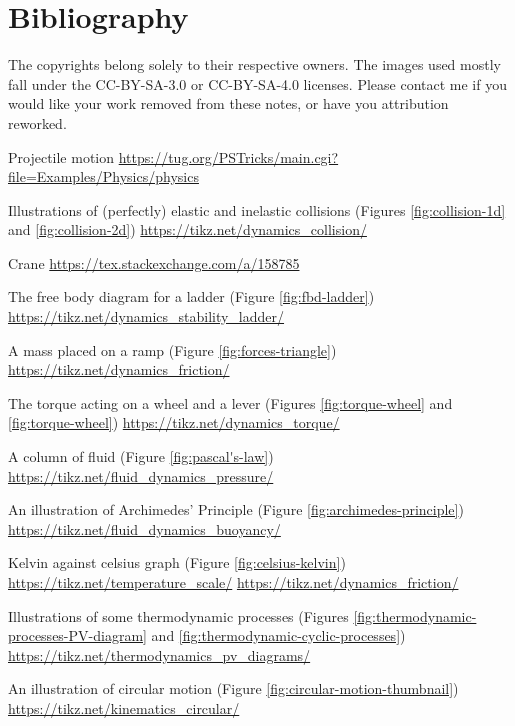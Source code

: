 \documentclass[oneside]{book}
\begin{document}
\chapter{Bibliography}
The copyrights belong solely to their respective owners. The images used mostly fall under the CC-BY-SA-3.0 or CC-BY-SA-4.0 licenses. Please contact me if you would like your work removed from these notes, or have you attribution reworked. 
\begin{enumerate}[label={[\arabic*]}]
    \item\label{Projectile motion} Projectile motion \url{https://tug.org/PSTricks/main.cgi?file=Examples/Physics/physics}
    \item\label{source:collision} Illustrations of (perfectly) elastic and inelastic collisions (Figures \ref{fig:collision-1d} and \ref{fig:collision-2d}) \url{https://tikz.net/dynamics_collision/}
    \item\label{Crane} Crane \url{https://tex.stackexchange.com/a/158785}
    \item\label{source:fbd-ladder} The free body diagram for a ladder (Figure \ref{fig:fbd-ladder}) \url{https://tikz.net/dynamics_stability_ladder/} 
    \item\label{source:forces-triangle} A mass placed on a ramp (Figure \ref{fig:forces-triangle}) \url{https://tikz.net/dynamics_friction/}
    \item\label{source:torque} The torque acting on a wheel and a lever (Figures \ref{fig:torque-wheel} and \ref{fig:torque-wheel}) \url{https://tikz.net/dynamics_torque/}
    \item\label{source:pascal's-law} A column of fluid (Figure \ref{fig:pascal's-law}) \url{https://tikz.net/fluid_dynamics_pressure/}
    \item\label{source:archimedes-principle} An illustration of Archimedes' Principle (Figure \ref{fig:archimedes-principle}) \url{https://tikz.net/fluid_dynamics_buoyancy/}
    \item\label{source:celsius-kelvin} Kelvin against celsius graph (Figure \ref{fig:celsius-kelvin}) \url{https://tikz.net/temperature_scale/} \url{https://tikz.net/dynamics_friction/}
    \item\label{source:thermodynamic-processes} Illustrations of some thermodynamic processes (Figures \ref{fig:thermodynamic-processes-PV-diagram} and \ref{fig:thermodynamic-cyclic-processes}) \url{https://tikz.net/thermodynamics_pv_diagrams/}
    \item\label{source:circular-motion-thumbnail} An illustration of circular motion (Figure \ref{fig:circular-motion-thumbnail}) \url{https://tikz.net/kinematics_circular/} 

\end{enumerate}
\end{document}
